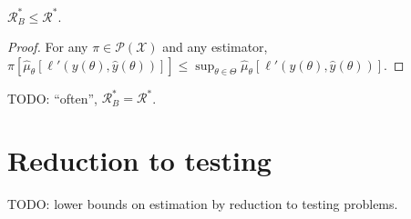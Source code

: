 \begin{lemma}
  \label{lem:bayesRisk_le_minimaxRisk}
  $\mathcal R_B^* \le \mathcal R^*$.
\end{lemma}

\begin{proof}
For any $\pi \in \mathcal P(\mathcal X)$ and any estimator, $\pi\left[\hat{\mu}_\theta\left[\ell'(y(\theta), \hat{y}(\theta))\right]\right] \le \sup_{\theta \in \Theta}\hat{\mu}_\theta\left[\ell'(y(\theta), \hat{y}(\theta))\right]$.
\end{proof}

TODO: ``often'', $\mathcal R^*_B = \mathcal R^*$.

\section{Reduction to testing}

TODO: lower bounds on estimation by reduction to testing problems.